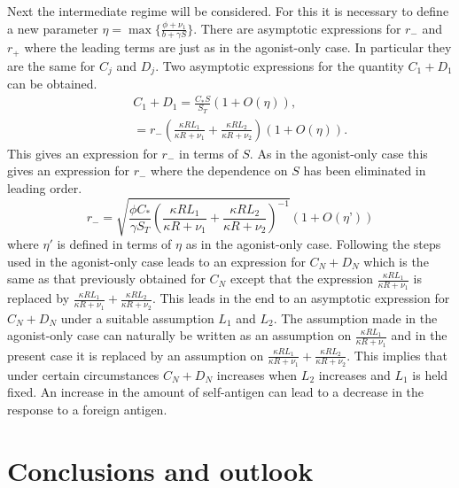 \documentclass{article}
\begin{document}
Next the intermediate regime will be considered. For this it is necessary to
define a new parameter $\eta=\max\{\frac{\phi+\nu_1}{b+\gamma S}\}$. There are 
asymptotic expressions for $r_-$ and $r_+$ where the leading terms are just as 
in the agonist-only case. In particular they are the same for $C_j$ and $D_j$.
Two asymptotic expressions for the quantity $C_1+D_1$ can be obtained.
\begin{eqnarray}
&&C_1+D_1=\frac{C_*S}{S_T}(1+O(\eta)),\\
&&=r_-\left(\frac{\kappa RL_1}{\kappa R+\nu_1}
+\frac{\kappa RL_2}{\kappa R+\nu_2}\right)(1+O(\eta)).
\end{eqnarray}
This gives an expression for $r_-$ in terms of $S$. As in the agonist-only
case this gives an expression for $r_-$ where the dependence on $S$ has been
eliminated in leading order.
\begin{equation}
r_-=\sqrt{\frac{\phi C_*}{\gamma S_T}
\left(\frac{\kappa RL_1}{\kappa R+\nu_1}
+\frac{\kappa RL_2}{\kappa R+\nu_2}\right)^{-1}}(1+O(\eta’))
\end{equation}
where $\eta'$ is defined in terms of $\eta$ as in the agonist-only case.
Following the steps used in the agonist-only case leads to an expression
for $C_N+D_N$ which is the same as that previously obtained for $C_N$ except
that the expression $\frac{\kappa RL_1}{\kappa R+\nu_1}$ is replaced by
$\frac{\kappa RL_1}{\kappa R+\nu_1}+\frac{\kappa RL_2}{\kappa R+\nu_2}$.
This leads in the end to an asymptotic expression for $C_N+D_N$ under a 
suitable assumption $L_1$ and $L_2$. The assumption made in the 
agonist-only case can naturally be written as an assumption on 
$\frac{\kappa RL_1}{\kappa R+\nu_1}$ and in the present case it is replaced
by an assumption on 
$\frac{\kappa RL_1}{\kappa R+\nu_1}+\frac{\kappa RL_2}{\kappa R+\nu_2}$.
This implies that under certain circumstances $C_N+D_N$ increases when 
$L_2$ increases and $L_1$ is held fixed. An increase in the amount of 
self-antigen can lead to a decrease in the response to a foreign antigen.



\section{Conclusions and outlook}
\end{document}
